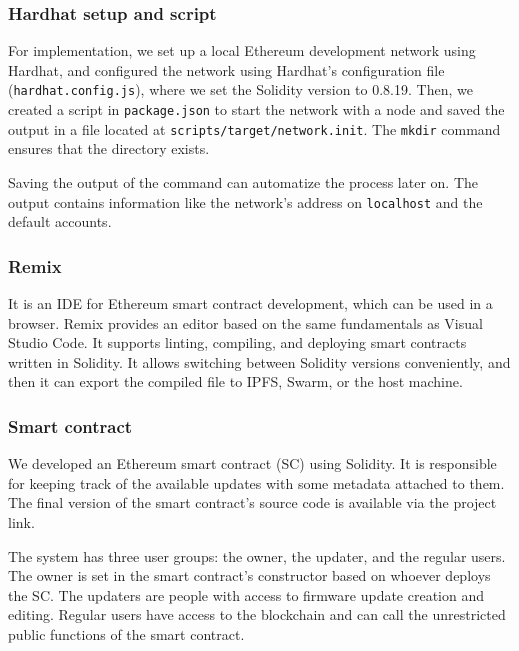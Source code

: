\documentclass[conference]{IEEEtran}
\begin{document}


\subsubsection{Hardhat setup and script}

For implementation, we set up a local Ethereum development network using Hardhat, and configured the network using Hardhat's configuration file (\texttt{hardhat.config.js}), where we set the Solidity version to 0.8.19. Then, we created a script in \texttt{package.json} to start the network with a node and saved the output in a file located at \texttt{scripts/target/network.init}. The \texttt{mkdir} command ensures that the directory exists.

Saving the output of the command can automatize the process later on. The output contains information like the network's address on \texttt{localhost} and the default accounts.

\subsubsection{Remix}
It is an IDE for Ethereum smart contract development, which can be used in a browser. Remix provides an editor based on the same fundamentals as Visual Studio Code. It supports linting, compiling, and deploying smart contracts written in Solidity. It allows switching between Solidity versions conveniently, and then it can export the compiled file to IPFS, Swarm, or the host machine.


\subsubsection{Smart contract}

We developed an Ethereum smart contract (SC) using Solidity. It is responsible for keeping track of the available updates with some metadata attached to them. The final version of the smart contract's source code is available via the project link.

The system has three user groups: the owner, the updater, and the regular users. The owner is set in the smart contract's constructor based on whoever deploys the SC. The updaters are people with access to firmware update creation and editing. Regular users have access to the blockchain and can call the unrestricted public functions of the smart contract.
\end{document}
